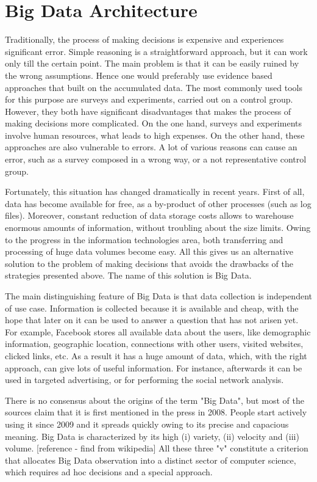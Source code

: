 \chapter{Big Data Architecture}
\label{chap:big_data_architecture}

Traditionally, the process of making decisions is expensive and experiences significant error.
Simple reasoning is a straightforward approach, but it can work only till the certain point.
The main problem is that it can be easily ruined by the wrong assumptions.
Hence one would preferably use evidence based approaches that built on the accumulated data.
The most commonly used tools for this purpose are surveys and experiments, carried out on a control group.   
However, they both have significant disadvantages that makes the process of making decisions more complicated. 
On the one hand, surveys and experiments involve human resources, what leads to high expenses.
On the other hand, these approaches are also vulnerable to errors.
A lot of various reasons can cause an error, such as a survey composed in a wrong way, or a not representative control group.
 
Fortunately, this situation has changed dramatically in recent years.
First of all, data has become available for free, as a by-product of other processes (such as log files).
Moreover, constant reduction of data storage costs allows to warehouse enormous amounts of information, without troubling about the size limits.
Owing to the progress in the information technologies area, both transferring and processing of huge data volumes become easy.
All this gives us an alternative solution to the problem of making decisions that avoids the drawbacks of the strategies presented above.
The name of this solution is Big Data.

The main distinguishing feature of Big Data is that data collection is independent of use case.
Information is collected because it is available and cheap, with the hope that later on it can be used to answer a question that has not arisen yet.
For example, Facebook stores all available data about the users, like demographic information, geographic location, connections with other users, visited websites, clicked links, etc.
As a result it has a huge amount of data, which, with the right approach, can give lots of useful information. 
For instance, afterwards it can be used in targeted advertising, or for performing the social network analysis.

There is no consensus about the origins of the term "Big Data", but most of the sources claim that it is first mentioned in the press in 2008.
People start actively using it since 2009 and it spreads quickly owing to its precise and capacious meaning. 
Big Data is characterized by its high (i) variety, (ii) velocity and (iii) volume. [reference - find from wikipedia]
All these three "v" constitute a criterion that allocates Big Data observation into a distinct sector of computer science, which requires ad hoc decisions and a special approach.

